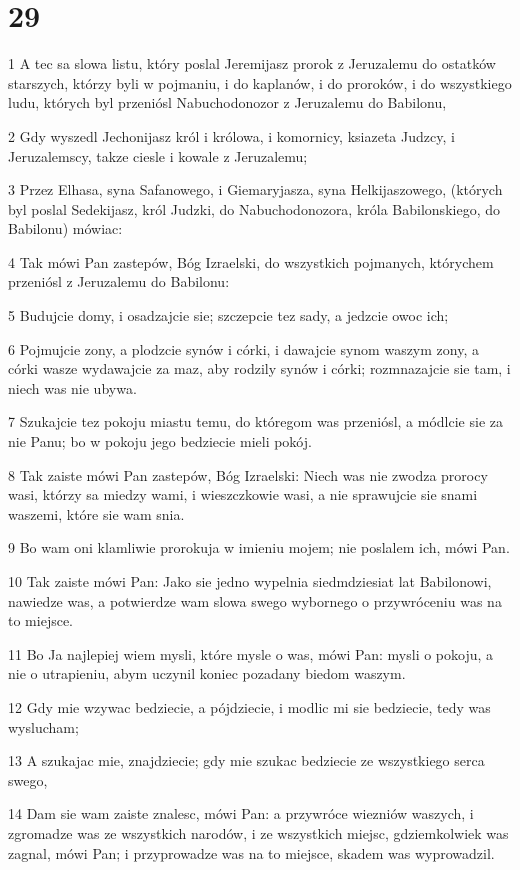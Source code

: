 \chapter{29}

\par 1 A tec sa slowa listu, który poslal Jeremijasz prorok z Jeruzalemu do ostatków starszych, którzy byli w pojmaniu, i do kaplanów, i do proroków, i do wszystkiego ludu, których byl przeniósl Nabuchodonozor z Jeruzalemu do Babilonu,
\par 2 Gdy wyszedl Jechonijasz król i królowa, i komornicy, ksiazeta Judzcy, i Jeruzalemscy, takze ciesle i kowale z Jeruzalemu;
\par 3 Przez Elhasa, syna Safanowego, i Giemaryjasza, syna Helkijaszowego, (których byl poslal Sedekijasz, król Judzki, do Nabuchodonozora, króla Babilonskiego, do Babilonu) mówiac:
\par 4 Tak mówi Pan zastepów, Bóg Izraelski, do wszystkich pojmanych, którychem przeniósl z Jeruzalemu do Babilonu:
\par 5 Budujcie domy, i osadzajcie sie; szczepcie tez sady, a jedzcie owoc ich;
\par 6 Pojmujcie zony, a plodzcie synów i córki, i dawajcie synom waszym zony, a córki wasze wydawajcie za maz, aby rodzily synów i córki; rozmnazajcie sie tam, i niech was nie ubywa.
\par 7 Szukajcie tez pokoju miastu temu, do któregom was przeniósl, a módlcie sie za nie Panu; bo w pokoju jego bedziecie mieli pokój.
\par 8 Tak zaiste mówi Pan zastepów, Bóg Izraelski: Niech was nie zwodza prorocy wasi, którzy sa miedzy wami, i wieszczkowie wasi, a nie sprawujcie sie snami waszemi, które sie wam snia.
\par 9 Bo wam oni klamliwie prorokuja w imieniu mojem; nie poslalem ich, mówi Pan.
\par 10 Tak zaiste mówi Pan: Jako sie jedno wypelnia siedmdziesiat lat Babilonowi, nawiedze was, a potwierdze wam slowa swego wybornego o przywróceniu was na to miejsce.
\par 11 Bo Ja najlepiej wiem mysli, które mysle o was, mówi Pan: mysli o pokoju, a nie o utrapieniu, abym uczynil koniec pozadany biedom waszym.
\par 12 Gdy mie wzywac bedziecie, a pójdziecie, i modlic mi sie bedziecie, tedy was wyslucham;
\par 13 A szukajac mie, znajdziecie; gdy mie szukac bedziecie ze wszystkiego serca swego,
\par 14 Dam sie wam zaiste znalesc, mówi Pan: a przywróce wiezniów waszych, i zgromadze was ze wszystkich narodów, i ze wszystkich miejsc, gdziemkolwiek was zagnal, mówi Pan; i przyprowadze was na to miejsce, skadem was wyprowadzil.
